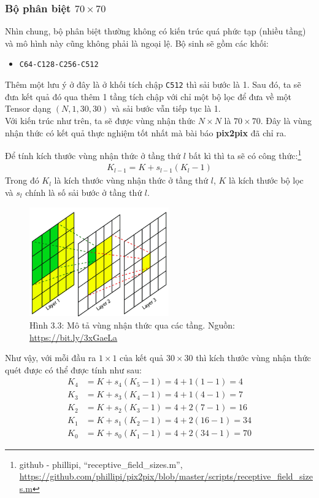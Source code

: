 \documentclass[a4paper]{article}
\begin{document}
\subsubsection{Bộ phân biệt $70 \times 70$}
Nhìn chung, bộ phân biệt thường không có kiến trúc quá phức tạp (nhiều tầng) và mô hình này cũng không phải là ngoại lệ. Bộ sinh sẽ gồm các khối:

\begin{itemize}
    \item \texttt{C64-C128-C256-C512}
\end{itemize}

\noindent
Thêm một lưu ý ở đây là ở khối tích chập \texttt{C512} thì sải bước là 1. Sau đó, ta sẽ đưa kết quả đó qua thêm 1 tầng tích chập với chỉ một bộ lọc để đưa về một Tensor dạng $(N, 1, 30, 30)$ và sải bước vẫn tiếp tục là 1.\\
Với kiến trúc như trên, ta sẽ được vùng nhận thức $N \times N$ là $70 \times 70$. Đây là vùng nhận thức có kết quả thực nghiệm tốt nhất mà bài báo \textbf{pix2pix} đã chỉ ra.

\noindent
Để tính kích thước vùng nhận thức ở tầng thứ $l$ bất kì thì ta sẽ có công thức:\footnote{github - phillipi, ``receptive\_field\_sizes.m'', \href{https://github.com/phillipi/pix2pix/blob/master/scripts/receptive\_field\_sizes.m}{https://github.com/phillipi/pix2pix/blob/master/scripts/receptive\_field\_sizes.m}}
\begin{align*}
    K_{l-1} = K + s_{l-1}(K_{l} - 1)
\end{align*}
Trong đó $K_l$ là kích thước vùng nhận thức ở tầng thứ $l$, $K$ là kích thước bộ lọc và $s_{l}$ chính là số sải bước ở tầng thứ $l$.

\begin{figure}[h!]
\centering
\includegraphics[width=6cm]{images/3_3.png}
\caption{Hình 3.3: Mô tả vùng nhận thức qua các tầng. Nguồn: \href{https://bit.ly/3xGaeLa}{https://bit.ly/3xGaeLa}}
\end{figure}

\noindent
Như vậy, với mỗi đầu ra $1 \times 1$ của kết quả $30\times 30$ thì kích thước vùng nhận thức quét được có thể được tính như sau:
\begin{align*}
    K_4 &= K + s_4(K_5 - 1) = 4 + 1(1-1) = 4\\
    K_3 &= K + s_3(K_4 - 1) = 4 + 1(4-1) = 7\\
    K_2 &= K + s_2(K_3 - 1) = 4 + 2(7-1) = 16\\
    K_1 &= K + s_1(K_2 - 1) = 4 + 2(16-1) = 34\\
    K_0 &= K + s_0(K_1 - 1) = 4 + 2(34 - 1) = 70
\end{align*}
\end{document}
